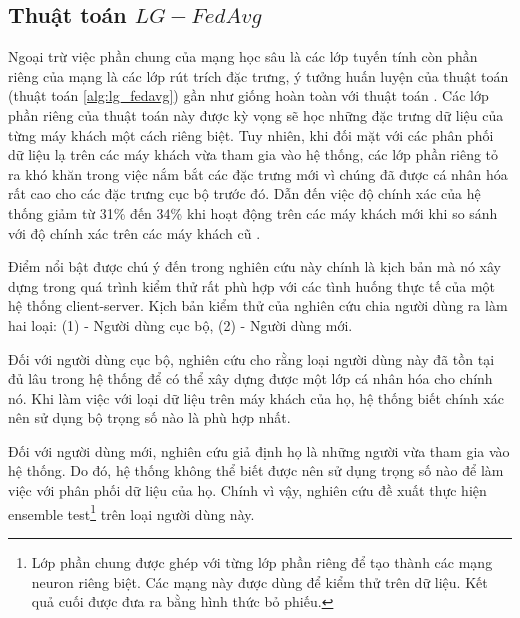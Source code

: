 \subsection{Thuật toán $LG-FedAvg$}

Ngoại trừ việc phần chung của mạng học sâu là các lớp tuyến tính còn phần riêng của mạng là các lớp rút trích đặc trưng, ý tưởng huấn luyện của thuật toán  (thuật toán \ref{alg:lg_fedavg}) gần như giống hoàn toàn với thuật toán . Các lớp phần riêng của thuật toán này được kỳ vọng sẽ học những đặc trưng dữ liệu của từng máy khách một cách riêng biệt. Tuy nhiên, khi đối mặt với các phân phối dữ liệu lạ trên các máy khách vừa tham gia vào hệ thống, các lớp phần riêng tỏ ra khó khăn trong việc nắm bắt các đặc trưng mới vì chúng đã được cá nhân hóa rất cao cho các đặc trưng cục bộ trước đó. Dẫn đến việc độ chính xác của hệ thống giảm từ 31\% đến 34\% khi hoạt động trên các máy khách mới khi so sánh với độ chính xác trên các máy khách cũ \cite{liang2020think}.

Điểm nổi bật được chú ý đến trong nghiên cứu này chính là kịch bản mà nó xây dựng trong quá trình kiểm thử rất phù hợp với các tình huống thực tế của một hệ thống client-server. Kịch bản kiểm thử của nghiên cứu \cite{liang2020think} chia người dùng ra làm hai loại: (1) - Người dùng cục bộ, (2) - Người dùng mới.

Đối với người dùng cục bộ, nghiên cứu cho rằng loại người dùng này đã tồn tại đủ lâu trong hệ thống để có thể xây dựng được một lớp cá nhân hóa cho chính nó. Khi làm việc với loại dữ liệu trên máy khách của họ, hệ thống biết chính xác nên sử dụng bộ trọng số nào là phù hợp nhất.

\label{ensemble_test}
Đối với người dùng mới, nghiên cứu giả định họ là những người vừa tham gia vào hệ thống. Do đó, hệ thống không thể biết được nên sử dụng trọng số nào để làm việc với phân phối dữ liệu của họ. Chính vì vậy, nghiên cứu đề xuất thực hiện ensemble test\footnote{Lớp phần chung được ghép với từng lớp phần riêng để tạo thành các mạng neuron riêng biệt. Các mạng này được dùng để kiểm thử trên dữ liệu. Kết quả cuối được đưa ra bằng hình thức bỏ phiếu.} trên loại người dùng này.

